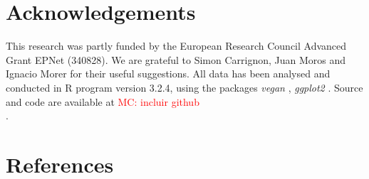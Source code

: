 \documentclass[review]{elsarticle}
\newcommand{\memo}[2]{\textcolor{#1}{#2}}
\newcommand{\maria}[1]{\memo{red}{MC: #1\\}}
\begin{document}
\section{Acknowledgements}

This research was partly funded by the European Research Council Advanced Grant EPNet (340828). We are grateful to Simon Carrignon, Juan Moros and Ignacio Morer for their useful suggestions.  
All data has been analysed and conducted in R program version 3.2.4, using the packages \textit{vegan} \citep{oksanen_vegan_2007}, \textit{ggplot2} \citep{ggplot2:_2016}. Source and code are available at \maria{incluir github}. 

\section{References}

%

\end{document}
